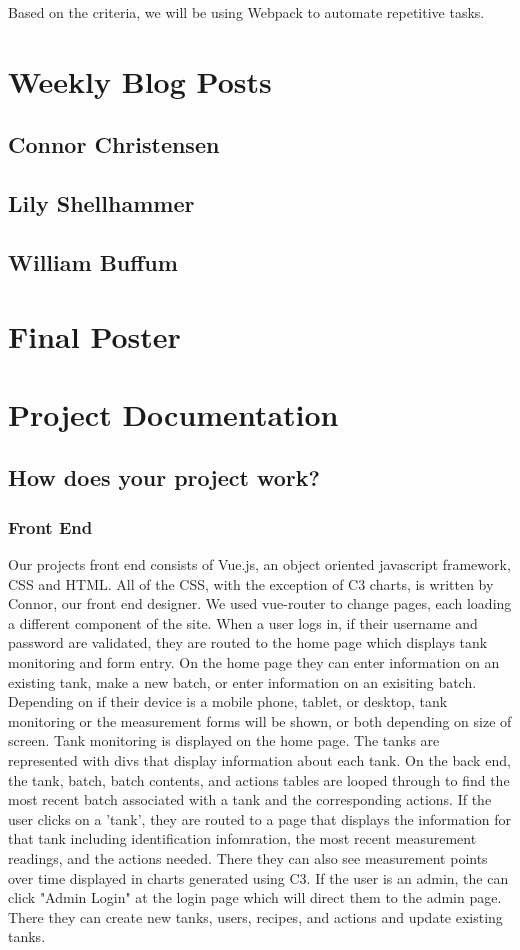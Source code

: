 \documentclass[draftclsnofoot,onecolumn,letterpaper,10pt]{IEEEtran}
\begin{document}
					Based on the criteria, we will be using Webpack to automate repetitive tasks.\\





\section{Weekly Blog Posts}
	\subsection{Connor Christensen}
	
	\subsection{Lily Shellhammer}
	
	\subsection{William Buffum}
	
\section{Final Poster}

\section{Project Documentation}
	\subsection{How does your project work?}
		\subsubsection{Front End}
		Our projects front end consists of Vue.js, an object oriented javascript framework, CSS and HTML.
		All of the CSS, with the exception of C3 charts, is written by Connor, our front end designer.
		We used vue-router to change pages, each loading a different component of the site.
		When a user logs in, if their username and password are validated, they are routed to the home page which displays tank monitoring and form entry.
		On the home page they can enter information on an existing tank, make a new batch, or enter information on an exisiting batch.
		Depending on if their device is a mobile phone, tablet, or desktop, tank monitoring or the measurement forms will be shown, or both depending on size of screen.
		Tank monitoring is displayed on the home page.
		The tanks are represented with divs that display information about each tank.
		On the back end, the tank, batch, batch contents, and actions tables are looped through to find the most recent batch associated with a tank and the corresponding actions.
		If the user clicks on a 'tank', they are routed to a page that displays the information for that tank including identification infomration, the most recent measurement readings, and the actions needed.
		There they can also see measurement points over time displayed in charts generated using C3.
		If the user is an admin, the can click "Admin Login" at the login page which will direct them to the admin page.
		There they can create new tanks, users, recipes, and actions and update existing tanks.
\end{document}
